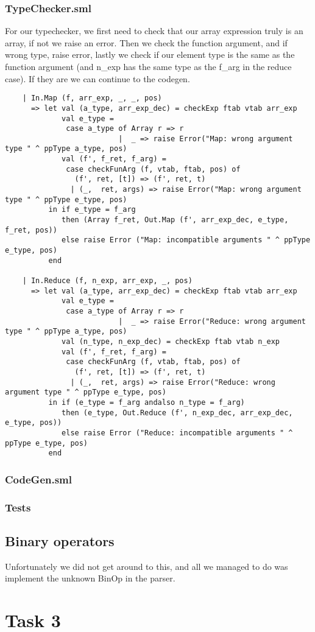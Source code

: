 \documentclass[12pt]{article}
\begin{document}
\subsubsection{TypeChecker.sml}
For our typechecker, we first need to check that our array expression truly is an array, if not we raise an error. Then we check the function argument, and if wrong type, raise error, lastly we check if our element type is the same as the function argument (and n_exp has the same type as the f_arg in the reduce case). If they are we can continue to the codegen.
\begin{verbatim}
    | In.Map (f, arr_exp, _, _, pos)
      => let val (a_type, arr_exp_dec) = checkExp ftab vtab arr_exp
             val e_type = 
              case a_type of Array r => r
                          |  _ => raise Error("Map: wrong argument type " ^ ppType a_type, pos)
             val (f', f_ret, f_arg) = 
              case checkFunArg (f, vtab, ftab, pos) of
                (f', ret, [t]) => (f', ret, t)
               | (_,  ret, args) => raise Error("Map: wrong argument type " ^ ppType e_type, pos)
          in if e_type = f_arg 
             then (Array f_ret, Out.Map (f', arr_exp_dec, e_type, f_ret, pos))
             else raise Error ("Map: incompatible arguments " ^ ppType e_type, pos)
          end
          
    | In.Reduce (f, n_exp, arr_exp, _, pos)
      => let val (a_type, arr_exp_dec) = checkExp ftab vtab arr_exp
             val e_type = 
              case a_type of Array r => r
                          |  _ => raise Error("Reduce: wrong argument type " ^ ppType a_type, pos)
             val (n_type, n_exp_dec) = checkExp ftab vtab n_exp
             val (f', f_ret, f_arg) = 
              case checkFunArg (f, vtab, ftab, pos) of
                (f', ret, [t]) => (f', ret, t)
               | (_,  ret, args) => raise Error("Reduce: wrong argument type " ^ ppType e_type, pos)
          in if (e_type = f_arg andalso n_type = f_arg)
             then (e_type, Out.Reduce (f', n_exp_dec, arr_exp_dec, e_type, pos))
             else raise Error ("Reduce: incompatible arguments " ^ ppType e_type, pos)
          end
\end{verbatim}
\subsubsection{CodeGen.sml}


\subsubsection{Tests}
\subsection{Binary operators}
Unfortunately we did not get around to this, and all we managed to do was implement the unknown BinOp in the parser.
\section{Task 3}
\end{document}
